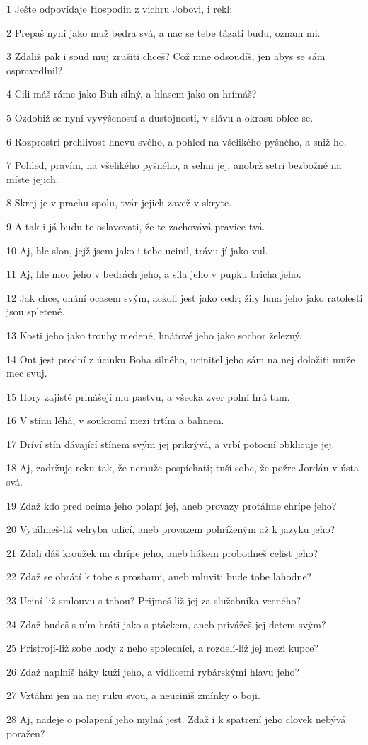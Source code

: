 \par 1 Ješte odpovídaje Hospodin z vichru Jobovi, i rekl:
\par 2 Prepaš nyní jako muž bedra svá, a nac se tebe tázati budu, oznam mi.
\par 3 Zdaliž pak i soud muj zrušiti chceš? Což mne odsoudíš, jen abys se sám ospravedlnil?
\par 4 Cili máš ráme jako Buh silný, a hlasem jako on hrímáš?
\par 5 Ozdobiž se nyní vyvýšeností a dustojností, v slávu a okrasu oblec se.
\par 6 Rozprostri prchlivost hnevu svého, a pohled na všelikého pyšného, a sniž ho.
\par 7 Pohled, pravím, na všelikého pyšného, a sehni jej, anobrž setri bezbožné na míste jejich.
\par 8 Skrej je v prachu spolu, tvár jejich zavež v skryte.
\par 9 A tak i já budu te oslavovati, že te zachovává pravice tvá.
\par 10 Aj, hle slon, jejž jsem jako i tebe ucinil, trávu jí jako vul.
\par 11 Aj, hle moc jeho v bedrách jeho, a síla jeho v pupku bricha jeho.
\par 12 Jak chce, ohání ocasem svým, ackoli jest jako cedr; žily luna jeho jako ratolesti jsou spletené.
\par 13 Kosti jeho jako trouby medené, hnátové jeho jako sochor železný.
\par 14 Ont jest prední z úcinku Boha silného, ucinitel jeho sám na nej doložiti muže mec svuj.
\par 15 Hory zajisté prinášejí mu pastvu, a všecka zver polní hrá tam.
\par 16 V stínu léhá, v soukromí mezi trtím a bahnem.
\par 17 Dríví stín dávající stínem svým jej prikrývá, a vrbí potocní obklicuje jej.
\par 18 Aj, zadržuje reku tak, že nemuže pospíchati; tuší sobe, že požre Jordán v ústa svá.
\par 19 Zdaž kdo pred ocima jeho polapí jej, aneb provazy protáhne chrípe jeho?
\par 20 Vytáhneš-liž velryba udicí, aneb provazem pohríženým až k jazyku jeho?
\par 21 Zdali dáš kroužek na chrípe jeho, aneb hákem probodneš celist jeho?
\par 22 Zdaž se obrátí k tobe s prosbami, aneb mluviti bude tobe lahodne?
\par 23 Uciní-liž smlouvu s tebou? Prijmeš-liž jej za služebníka vecného?
\par 24 Zdaž budeš s ním hráti jako s ptáckem, aneb privážeš jej detem svým?
\par 25 Pristrojí-liž sobe hody z neho spolecníci, a rozdelí-liž jej mezi kupce?
\par 26 Zdaž naplníš háky kuži jeho, a vidlicemi rybárskými hlavu jeho?
\par 27 Vztáhni jen na nej ruku svou, a neuciníš zmínky o boji.
\par 28 Aj, nadeje o polapení jeho mylná jest. Zdaž i k spatrení jeho clovek nebývá poražen?

